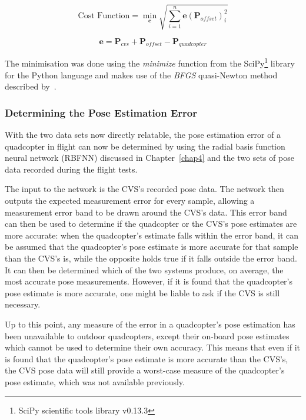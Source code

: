 \begin{equation}
  \label{eq:chap5-err-func}
  \text{Cost Function} = \min_{\bm{e}}\sqrt{\displaystyle\sum_{i=1}^{n} \bm{e}(\bm{P}_{of\!fset})_i^2}
\end{equation}

\begin{equation}
  \label{eq:chap5-err-term}
  \bm{e} = \bm{P}_{cvs} + \bm{P}_{of\!fset} - \bm{P}_{quadcopter}
\end{equation}

The minimisation was done using the \emph{minimize} function from the SciPy\footnote{SciPy scientific tools library v0.13.3} library for the Python language and makes use of the \emph{BFGS} quasi-Newton method described by~\cite{nocedal2006numerical}. 

\subsubsection{Determining the Pose Estimation Error}

With the two data sets now directly relatable, the pose estimation error of a quadcopter in flight can now be determined by using the radial basis function neural network (RBFNN) discussed in Chapter~\ref{chap4} and the two sets of pose data recorded during the flight tests.  

The input to the network is the CVS's recorded pose data. The network then outputs the expected measurement error for every sample, allowing a measurement error band to be drawn around the CVS's data. This error band can then be used to determine if the quadcopter or the CVS's pose estimates are more accurate: when the quadcopter's estimate falls within the error band, it can be assumed that the quadcopter's pose estimate is more accurate for that sample than the CVS's is, while the opposite holds true if it falls outside the error band. It can then be determined which of the two systems produce, on average, the most accurate pose measurements. However, if it is found that the quadcopter's pose estimate is more accurate, one might be liable to ask if the CVS is still necessary.

Up to this point, any measure of the error in a quadcopter's pose estimation has been unavailable to outdoor quadcopters, except their on-board pose estimates which cannot be used to determine their own accuracy. This means that even if it is found that the quadcopter's pose estimate is more accurate than the CVS's, the CVS pose data will still provide a worst-case measure of the quadcopter's pose estimate, which was not available previously. 


